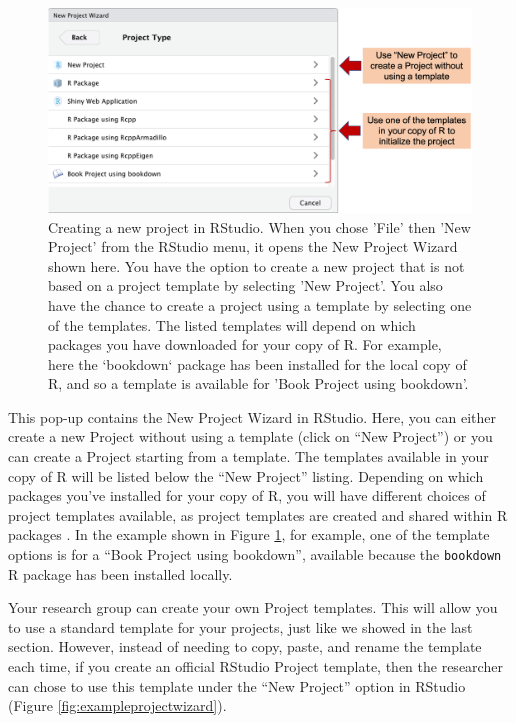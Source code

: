 \documentclass[]{tufte-book}
\begin{document}
\begin{figure}
\includegraphics[width=\textwidth]{figures/create_new_project} \caption[Creating a new project in RStudio]{Creating a new project in RStudio. When you chose 'File' then 'New Project' from the RStudio menu, it opens the New Project Wizard shown here. You have the option to create a new project that is not based on a project template by selecting 'New Project'. You also have the chance to create a project using a template by selecting one of the templates. The listed templates will depend on which packages you have downloaded for your copy of R. For example, here the `bookdown` package has been installed for the local copy of R, and so a template is available for 'Book Project using bookdown'.}\label{fig:createnewproject}
\end{figure}

This pop-up contains the New Project Wizard in RStudio. Here, you can either
create a new Project without using a template (click on ``New Project'') or you
can create a Project starting from a template. The templates available in your
copy of R will be listed below the ``New Project'' listing. Depending on which
packages you've installed for your copy of R, you will have different choices of
project templates available, as project templates are created and shared
within R packages \citep{rstudioprojecttemplate}. In the example shown in
Figure \ref{fig:createnewproject}, for example, one of the template options is
for a ``Book Project using bookdown'', available because the \texttt{bookdown} R package
has been installed locally.

Your research group can create your own Project templates. This will allow
you to use a standard template for your projects, just like we showed in the
last section. However, instead of needing to copy, paste, and rename the template
each time, if you create an official RStudio Project template, then the researcher
can chose to use this template under the ``New Project'' option in RStudio
(Figure \ref{fig:exampleprojectwizard}).
\end{document}
